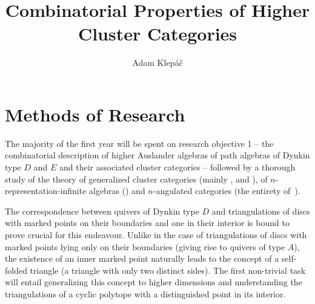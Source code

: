 \documentclass[a4paper,oneside,svgnames]{amsart}
\title{Combinatorial Properties of Higher Cluster Categories}
\author{Adam Klepáč}
\theoremstyle{plain}
\theoremstyle{definition}
\begin{document}
 \maketitle
 \section*{Methods of Research}
 \setcounter{section}{1}

 The majority of the first year will be spent on research objective 1 -- the
 combinatorial description of higher Auslander algebras of path algebras of
 Dynkin type $D$ and $E$ and their associated cluster categories -- followed by
 a thorough study of the theory of generalized cluster categories (mainly
 \cite[Sections 3 and 4]{amiot1}, \cite[Chapters 5,6 and 7]{amiot2} and
 \cite[Chapters 2 and 3]{guo}), of $n$-representation-infinite algebras
 (\cite[Sections 1-5]{hio}) and $n$-angulated categories (the entirety
 of~\cite{gko}).

 The correspondence between quivers of Dynkin type $D$ and triangulations of
 discs with marked points on their boundaries and one in their interior is bound
 to prove crucial for this endeavour. Unlike in the case of triangulations of
 discs with marked points lying only on their boundaries (giving rise to quivers
 of type $A$), the existence of an inner marked point naturally leads to the
 concept of a self-folded triangle (a triangle with only two distinct sides).
 The first non-trivial task will entail generalizing this concept to higher
 dimensions and understanding the triangulations of a cyclic polytope with a
 distinguished point in its interior.
\end{document}
